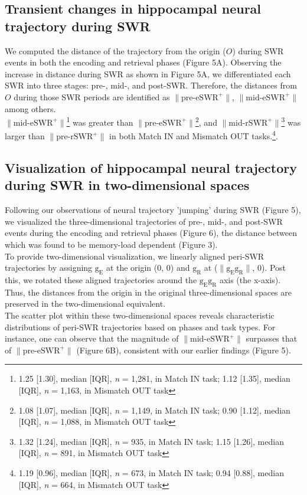\documentclass[final,3p,times,twocolumn]{elsarticle}
\begin{document}
\subsection{Transient changes in hippocampal neural trajectory during SWR}
We computed the distance of the trajectory from the origin ($O$) during SWR events in both the encoding and retrieval phases (Figure 5A). Observing the increase in distance during SWR as shown in Figure 5A, we differentiated each SWR into three stages: pre-, mid-, and post-SWR. Therefore, the distances from $O$ during those SWR periods are identified as $\mathrm{\lVert \text{pre-eSWR}^+ \rVert}$, $\mathrm{\lVert \text{mid-eSWR}^+ \rVert}$ among others.
\\
\indent
$\mathrm{\lVert \text{mid-eSWR}^+ \rVert}$\footnote{1.25 [1.30], median [IQR], \textit{n} = 1,281, in Match IN task; 1.12 [1.35], median [IQR], \textit{n} = 1,163, in Mismatch OUT task} was greater than $\mathrm{\lVert \text{pre-eSWR}^+ \rVert}$\footnote{1.08 [1.07], median [IQR], \textit{n} = 1,149, in Match IN task; 0.90 [1.12], median [IQR], \textit{n} = 1,088, in Mismatch OUT task}, and $\mathrm{\lVert \text{mid-rSWR}^+ \rVert}$\footnote{1.32 [1.24], median [IQR], \textit{n} = 935, in Match IN task; 1.15 [1.26], median [IQR], \textit{n} = 891, in Mismatch OUT task} was larger than $\mathrm{\lVert \text{pre-rSWR}^+ \rVert}$ in both Match IN and Mismatch OUT tasks.\footnote{1.19 [0.96], median [IQR], \textit{n} = 673, in Match IN task; 0.94 [0.88], median [IQR], \textit{n} = 664, in Mismatch OUT task}.

\subsection{Visualization of hippocampal neural trajectory during SWR in two-dimensional spaces}
Following our observations of neural trajectory 'jumping' during SWR (Figure 5), we visualized the three-dimensional trajectories of pre-, mid-, and post-SWR events during the encoding and retrieval phases (Figure 6), the distance between which was found to be memory-load dependent (Figure 3).
\\
\indent
To provide two-dimensional visualization, we linearly aligned peri-SWR trajectories by assigning $\mathrm{g_{E}}$ at the origin (0, 0) and $\mathrm{g_{R}}$ at ($\mathrm{\lVert g_{E}g_{R} \rVert}$, 0). Post this, we rotated these aligned trajectories around the $\mathrm{g_{E}g_{R}}$ axis (the x-axis). Thus, the distances from the origin in the original three-dimensional spaces are preserved in the two-dimensional equivalent.
\\
\indent
The scatter plot within these two-dimensional spaces reveals characteristic distributions of peri-SWR trajectories based on phases and task types. For instance, one can observe that the magnitude of  $\mathrm{\lVert \text{mid-eSWR}^+ \rVert}$ surpasses that of $\mathrm{\lVert \text{pre-eSWR}^+ \rVert}$ (Figure 6B), consistent with our earlier findings (Figure 5).
\end{document}
